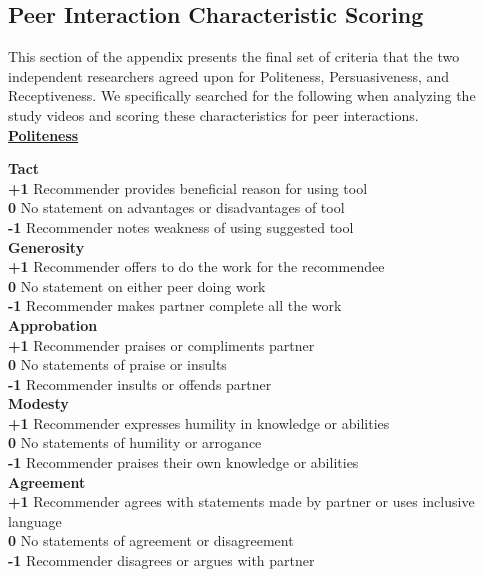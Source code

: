 \subsection{Peer Interaction Characteristic Scoring}
\label{app-peer-scoring}

This section of the appendix presents the final set of criteria that the two independent researchers agreed upon for Politeness, Persuasiveness, and Receptiveness. We specifically searched for the following when analyzing the study videos and scoring these characteristics for peer interactions. \\

\noindent
\textbf{\underline{Politeness}}

\noindent
\textbf{Tact}\\
\textbf{+1} Recommender provides beneficial reason for using tool \\
\textbf{0}  No statement on advantages or disadvantages of tool \\
\textbf{-1} Recommender notes weakness of using suggested tool \\

\noindent
\textbf{Generosity} \\
\textbf{+1} Recommender offers to do the work for the recommendee \\
\textbf{0}  No statement on either peer doing work \\
\textbf{-1} Recommender makes partner complete all the work \\

\noindent
\textbf{Approbation} \\
\textbf{+1} Recommender praises or compliments partner \\
\textbf{0}  No statements of praise or insults \\
\textbf{-1} Recommender insults or offends partner \\

\noindent
\textbf{Modesty} \\
\textbf{+1} Recommender expresses humility in knowledge or abilities\\
\textbf{0}  No statements of humility or arrogance \\
\textbf{-1} Recommender praises their own knowledge or abilities \\

\noindent
\textbf{Agreement}\\
\textbf{+1} Recommender agrees with statements made by partner or uses inclusive language\\
\textbf{0}  No statements of agreement or disagreement\\
\textbf{-1} Recommender disagrees or argues with partner\\

